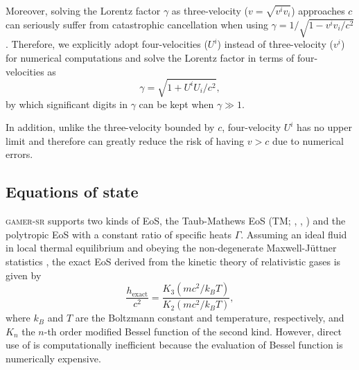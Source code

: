 \documentclass[twocolumn]{aastex63}
\begin{document}

Moreover, solving the Lorentz factor $\gamma$ as three-velocity ($v=\sqrt{v^{i}v_{i}}$) approaches $c$ can seriously suffer from catastrophic cancellation when using $\gamma=1/\sqrt{1-v^{i}v_{i}/c^2}$. Therefore, we explicitly adopt four-velocities ($U^{i}$) instead of three-velocity ($v^{i}$) for numerical computations and solve the Lorentz factor in terms of four-velocities as
\begin{equation}
\label{eq:new expression of Lorentz factor}
\gamma=\sqrt{1+U^iU_i/c^2},
\end{equation}
by which significant digits in $\gamma$ can be kept when $\gamma \gg 1$.

In addition, unlike the three-velocity bounded by $c$, four-velocity $U^i$ has no upper limit and therefore can greatly reduce the risk of having $v>c$ due to numerical errors.

\subsection{Equations of state}
\label{EoS}
\textsc{gamer-sr} supports two kinds of EoS, the Taub-Mathews EoS (TM; \citealt{Taub}, \citealt{TM_EOS}, \citealt{Compare_TM_EOS}) and the polytropic EoS with a constant ratio of specific heats $\Gamma$. Assuming an ideal fluid in local thermal equilibrium and obeying the non-degenerate Maxwell-J\"{u}ttner statistics \citep{Juttner}, the exact EoS \citep{Synge} derived from the kinetic theory of relativistic gases is given by
\begin{equation}
    \frac{h_{\text{exact}}}{c^2}=
    \frac{K_{3}\left(mc^2/k_{B}T\right)}
         {K_{2}\left(mc^2/k_{B}T\right)},
\label{EXACT_EOS}
\end{equation}
where $k_{B}$ and $T$ are the Boltzmann constant and temperature, respectively, and $K_{n}$ the $n$-th order modified Bessel function of the second kind. However, direct use of  is computationally inefficient because the evaluation of Bessel function is numerically expensive.
\end{document}
